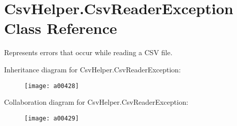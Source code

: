 \hypertarget{a00072}{\section{Csv\-Helper.\-Csv\-Reader\-Exception Class Reference}
\label{a00072}
}


Represents errors that occur while reading a C\-S\-V file.  




Inheritance diagram for Csv\-Helper.\-Csv\-Reader\-Exception\-:
\nopagebreak
\begin{figure}[H]
\begin{center}
\leavevmode
\texttt{[image: a00428]}
\end{center}
\end{figure}


Collaboration diagram for Csv\-Helper.\-Csv\-Reader\-Exception\-:
\nopagebreak
\begin{figure}[H]
\begin{center}
\leavevmode
\texttt{[image: a00429]}
\end{center}
\end{figure}
